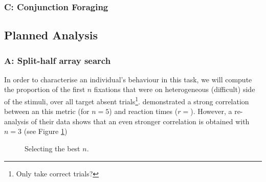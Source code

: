 \documentclass[a4paper, oneside, 11pt, onecolumn]{article}
\begin{document}
\subsubsection{C: Conjunction Foraging}

\subsection{Planned Analysis}

\subsubsection{A: Split-half array search}

In order to characterise an individual's behaviour in this task, we will compute the proportion of the first $n$ fixations that were on heterogeneous (difficult) side of the stimuli, over all target absent trials\footnote{Only take correct trials?}. \cite{nowakowsak2017} demonstrated a strong correlation between an this metric (for $n=5$) and reaction times ($r=$). However, a re-analysis of their data shows that an even stronger correlation is obtained with $n=3$ (see Figure \ref{fig:nowakowskaBestN})

\begin{figure}
\centering
{}
\caption{Selecting the best $n$.}
\label{fig:nowakowskaBestN}
\end{figure}
\end{document}
